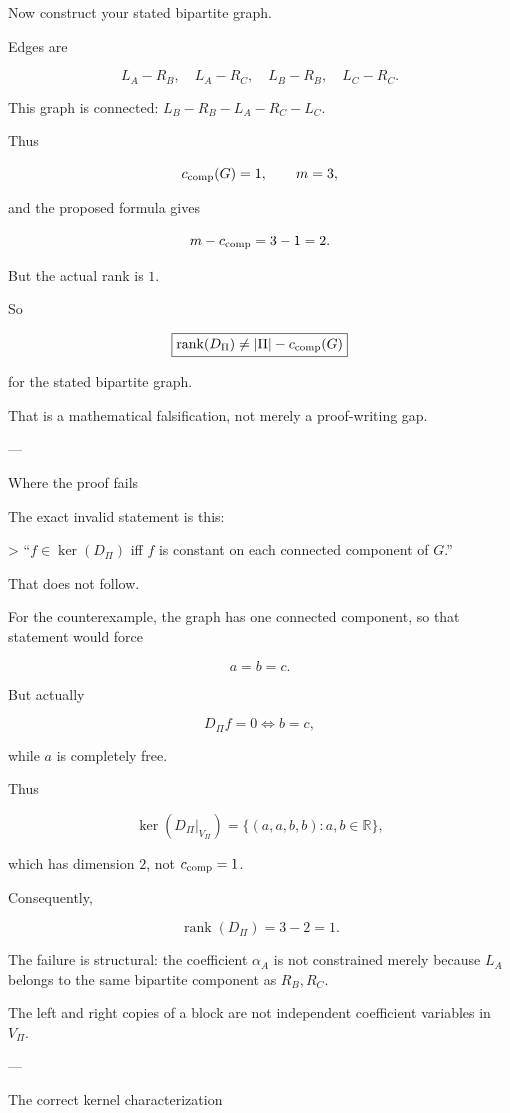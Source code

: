 Now construct your stated bipartite graph.

Edges are

\[
L_A-R_B,\quad  
L_A-R_C,\quad  
L_B-R_B,\quad  
L_C-R_C.  
\]

This graph is connected: \(L_B-R_B-L_A-R_C-L_C\).

Thus

\[
c_{\rm comp}(G)=1,  
\qquad  
m=3,  
\]

and the proposed formula gives

\[
m-c_{\rm comp}=3-1=2.  
\]

But the actual rank is \(1\).

So

\[
\boxed{\operatorname{rank}(D_\Pi)\ne |\Pi|-c_{\rm comp}(G)}  
\]

for the stated bipartite graph.

That is a mathematical falsification, not merely a proof-writing gap.


---

Where the proof fails

The exact invalid statement is this:

> “\(f\in\ker(D_\Pi)\) iff \(f\) is constant on each connected component of \(G\).”



That does not follow.

For the counterexample, the graph has one connected component, so that statement would force

\[
a=b=c.  
\]

But actually

\[
D_\Pi f=0  
\iff b=c,  
\]

while \(a\) is completely free.

Thus

\[
\ker(D_\Pi|_{V_\Pi})  
=  
\{(a,a,b,b):a,b\in\mathbb R\},  
\]

which has dimension \(2\), not \(c_{\rm comp}=1\).

Consequently,

\[
\operatorname{rank}(D_\Pi)  
=  
3-2  
=  
1.  
\]

The failure is structural: the coefficient \(\alpha_A\) is not constrained merely because \(L_A\) belongs to the same bipartite component as \(R_B,R_C\).

The left and right copies of a block are not independent coefficient variables in \(V_\Pi\).


---

The correct kernel characterization

